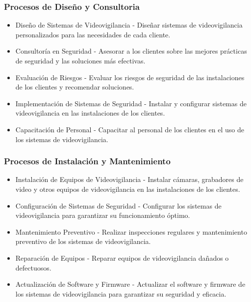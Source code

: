 \documentclass{report}
\begin{document}
        \subsubsection*{Procesos de Diseño y Consultoria}
          \begin{itemize}
            \item Diseño de Sistemas de Videovigilancia - Diseñar sistemas de videovigilancia personalizados para las necesidades de cada cliente.
            \item Consultoría en Seguridad - Asesorar a los clientes sobre las mejores prácticas de seguridad y las soluciones más efectivas.
            \item Evaluación de Riesgos - Evaluar los riesgos de seguridad de las instalaciones de los clientes y recomendar soluciones.
            \item Implementación de Sistemas de Seguridad - Instalar y configurar sistemas de videovigilancia en las instalaciones de los clientes.
            \item Capacitación de Personal - Capacitar al personal de los clientes en el uso de los sistemas de videovigilancia.
          \end{itemize}
        \subsubsection*{Procesos de Instalación y Mantenimiento}
          \begin{itemize}
            \item Instalación de Equipos de Videovigilancia - Instalar cámaras, grabadores de video y otros equipos de videovigilancia en las instalaciones de los clientes.
            \item Configuración de Sistemas de Seguridad - Configurar los sistemas de videovigilancia para garantizar su funcionamiento óptimo.
            \item Mantenimiento Preventivo - Realizar inspecciones regulares y mantenimiento preventivo de los sistemas de videovigilancia.
            \item Reparación de Equipos - Reparar equipos de videovigilancia dañados o defectuosos.
            \item Actualización de Software y Firmware - Actualizar el software y firmware de los sistemas de videovigilancia para garantizar su seguridad y eficacia.
          \end{itemize}
\end{document}
